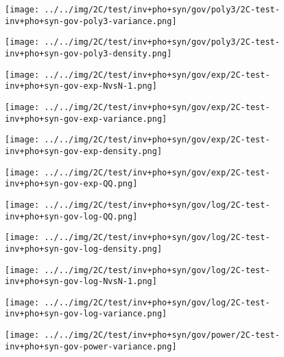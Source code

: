 \begin{figure}[H]
\centering	\texttt{[image: ../../img/2C/test/inv+pho+syn/gov/poly3/2C-test-inv+pho+syn-gov-poly3-variance.png]}
\end{figure}
\begin{figure}[H]
\centering	\texttt{[image: ../../img/2C/test/inv+pho+syn/gov/poly3/2C-test-inv+pho+syn-gov-poly3-density.png]}
\end{figure}
\begin{figure}[H]
\centering	\texttt{[image: ../../img/2C/test/inv+pho+syn/gov/exp/2C-test-inv+pho+syn-gov-exp-NvsN-1.png]}
\end{figure}
\begin{figure}[H]
\centering	\texttt{[image: ../../img/2C/test/inv+pho+syn/gov/exp/2C-test-inv+pho+syn-gov-exp-variance.png]}
\end{figure}
\begin{figure}[H]
\centering	\texttt{[image: ../../img/2C/test/inv+pho+syn/gov/exp/2C-test-inv+pho+syn-gov-exp-density.png]}
\end{figure}
\begin{figure}[H]
\centering	\texttt{[image: ../../img/2C/test/inv+pho+syn/gov/exp/2C-test-inv+pho+syn-gov-exp-QQ.png]}
\end{figure}
\begin{figure}[H]
\centering	\texttt{[image: ../../img/2C/test/inv+pho+syn/gov/log/2C-test-inv+pho+syn-gov-log-QQ.png]}
\end{figure}
\begin{figure}[H]
\centering	\texttt{[image: ../../img/2C/test/inv+pho+syn/gov/log/2C-test-inv+pho+syn-gov-log-density.png]}
\end{figure}
\begin{figure}[H]
\centering	\texttt{[image: ../../img/2C/test/inv+pho+syn/gov/log/2C-test-inv+pho+syn-gov-log-NvsN-1.png]}
\end{figure}
\begin{figure}[H]
\centering	\texttt{[image: ../../img/2C/test/inv+pho+syn/gov/log/2C-test-inv+pho+syn-gov-log-variance.png]}
\end{figure}
\begin{figure}[H]
\centering	\texttt{[image: ../../img/2C/test/inv+pho+syn/gov/power/2C-test-inv+pho+syn-gov-power-variance.png]}
\end{figure}
